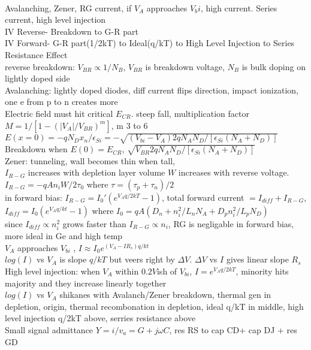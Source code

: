 \documentclass{article}
\begin{document}
\begin{large}
\\Avalanching, Zener, RG current, if $V_A$ approaches $V_bi$, high current. Series current, high level injection
\\IV Reverse- Breakdown to G-R part
\\IV Forward- G-R part(1/2kT) to Ideal(q/kT) to High Level Injection to Series Resistance Effect
\\reverse breakdown: $V_{BR}\propto 1/N_B$, $V_{BR}$ is breakdown voltage, $N_B$ is bulk doping on lightly doped side
\\Avalanching: lightly doped diodes, diff current flips direction, impact ionization, one e from p to n creates more
\\Electric field must hit critical $E_{CR}$. steep fall, multiplication factor $M=1/[1-(|V_A|/V_{BR})^m]$, m 3 to 6
\\$E(x=0)=-q N_D x_n/\epsilon_{Si}=-\sqrt{(V_{bi}-V_A) 2q N_AN_D/[\epsilon_{Si}(N_A+N_D)]}$
\\Breakdown when $E(0)=E_{CR}$, $\sqrt{V_{BR} 2q N_AN_D/[\epsilon_{Si}(N_A+N_D)]}$
\\Zener: tunneling, wall becomes thin when tall, 
\\$I_{R-G}$ increases with depletion layer volume $W$ increases with reverse voltage.
\\$I_{R-G}=-q A n_i W / 2\tau_0$ where $\tau=(\tau_p+\tau_n)/2$
\\in forward bias: $I_{R-G}=I_0'(e^{V_A q/2kT}-1)$, total forward current $= I_{diff}+I_{R-G}$, $I_{diff}=I_0(e^{V_A q/kt}-1)$ where $I_0=qA(D_n+n_i^2/L_nN_A + D_pn_i^2/L_pN_D)$
\\since $I_{diff}\propto n_i^2$ grows faster than $I_{R-G}\propto n_i$, RG is negligable in forward bias, more ideal in Ge and high temp
\\$V_A$ approaches $V_{bi}$ , $I\approx I_0e^{(V_A-IR_s)q/kt}$ 
\\$log(I)$ vs $V_A$ is slope $q/kT$ but veers right by $\Delta V$. $\Delta V$ vs $I$ gives linear slope $R_s$
\\High level injection: when $V_A$ within $0.2V$ish of $V_{bi}$, $I=e^{V_A q/2kT}$, minority hits majority and they increase linearly together
\\$log(I)$ vs $V_A$ shikanes with Avalanch/Zener breakdown, thermal gen in depletion, origin, thermal recombonation in depletion, ideal q/kT in middle, high level injection q/2kT above, serries resistance above
\\Small signal admittance $Y=i/v_a=G+j\omega C$, res RS to cap CD+ cap DJ + res GD

\end{large}
\end{document}
